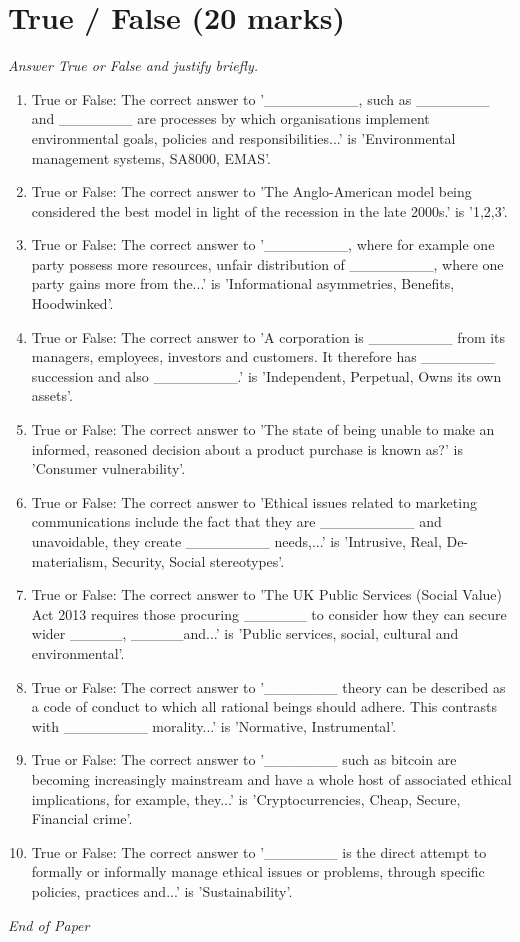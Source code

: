\documentclass[12pt]{article}
\begin{document}
\section*{True / False (20 marks)}
\textit{Answer True or False and justify briefly.}
\begin{enumerate}[label=\arabic*.]
\item True or False: The correct answer to '\_\_\_\_\_\_\_\_\_, such as \_\_\_\_\_\_\_ and \_\_\_\_\_\_\_ are processes by which organisations implement environmental goals, policies and responsibilities...' is 'Environmental management systems, SA8000, EMAS'.
\item True or False: The correct answer to 'The Anglo-American model being considered the best model in light of the recession in the late 2000s.' is '1,2,3'.
\item True or False: The correct answer to '\_\_\_\_\_\_\_\_, where for example one party possess more resources, unfair distribution of \_\_\_\_\_\_\_\_, where one party gains more from the...' is 'Informational asymmetries, Benefits, Hoodwinked'.
\item True or False: The correct answer to 'A corporation is \_\_\_\_\_\_\_\_ from its managers, employees, investors and customers. It therefore has \_\_\_\_\_\_\_ succession and also \_\_\_\_\_\_\_\_.' is 'Independent, Perpetual, Owns its own assets'.
\item True or False: The correct answer to 'The state of being unable to make an informed, reasoned decision about a product purchase is known as?' is 'Consumer vulnerability'.
\item True or False: The correct answer to 'Ethical issues related to marketing communications include the fact that they are \_\_\_\_\_\_\_\_\_ and unavoidable, they create \_\_\_\_\_\_\_\_ needs,...' is 'Intrusive, Real, De-materialism, Security, Social stereotypes'.
\item True or False: The correct answer to 'The UK Public Services (Social Value) Act 2013 requires those procuring \_\_\_\_\_\_ to consider how they can secure wider \_\_\_\_\_, \_\_\_\_\_and...' is 'Public services, social, cultural and environmental'.
\item True or False: The correct answer to '\_\_\_\_\_\_\_ theory can be described as a code of conduct to which all rational beings should adhere. This contrasts with \_\_\_\_\_\_\_\_ morality...' is 'Normative, Instrumental'.
\item True or False: The correct answer to '\_\_\_\_\_\_\_ such as bitcoin are becoming increasingly mainstream and have a whole host of associated ethical implications, for example, they...' is 'Cryptocurrencies, Cheap, Secure, Financial crime'.
\item True or False: The correct answer to '\_\_\_\_\_\_\_ is the direct attempt to formally or informally manage ethical issues or problems, through specific policies, practices and...' is 'Sustainability'.
\end{enumerate}

\vfill
\noindent\textit{End of Paper}
\end{document}
